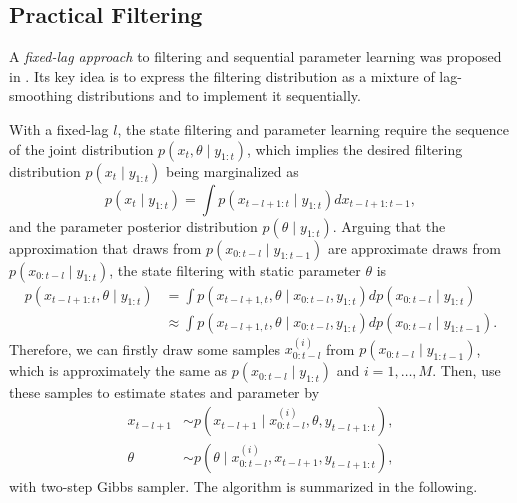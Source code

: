 \subsection{Practical Filtering}

A \textit{fixed-lag approach} to filtering and sequential parameter learning was proposed in \citep{polson2008practical}. Its key idea is to express the filtering distribution as a mixture of lag-smoothing distributions and to implement it sequentially. 

With a fixed-lag $l$, the state filtering and parameter learning require the sequence of the joint distribution $p(x_t,\theta\mid y_{1:t})$, which implies the desired filtering distribution $p(x_t\mid y_{1:t})$ being marginalized as 
\begin{equation*}
p(x_t\mid y_{1:t}) = \int p(x_{t-l+1:t}\mid y_{1:t}) dx_{t-l+1:t-1},
\end{equation*}
and the parameter posterior distribution $p(\theta\mid y_{1:t})$. Arguing that the approximation that draws from $p(x_{0:t-l}\mid y_{1:t-1})$ are approximate draws from $p(x_{0:t-l}\mid y_{1:t})$, the state filtering with static parameter $\theta$ is 
\begin{align*}
p(x_{t-l+1:t},\theta\mid y_{1:t}) &=\int p(x_{t-l+1,t},\theta \mid x_{0:t-l},y_{1:t}) dp(x_{0:t-l}\mid y_{1:t}) \\
&\approx \int p(x_{t-l+1,t},\theta \mid x_{0:t-l},y_{1:t}) dp(x_{0:t-l}\mid y_{1:t-1}).
\end{align*}
Therefore, we can firstly draw some samples $x_{0:t-l}^{(i)}$ from $p(x_{0:t-l}\mid y_{1:t-1})$, which is approximately the same as $p(x_{0:t-l}\mid y_{1:t})$ and $i=1,\ldots,M$. Then, use these samples to estimate states and parameter by 
\begin{align*}
x_{t-l+1} &\sim p\left(x_{t-l+1}\mid x_{0:t-l}^{(i)},\theta,y_{t-l+1:t}\right),\\
\theta &\sim p\left(\theta \mid x_{0:t-l}^{(i)},x_{t-l+1},y_{t-l+1:t}\right),
\end{align*}
with two-step Gibbs sampler. The algorithm is summarized in the following. 
